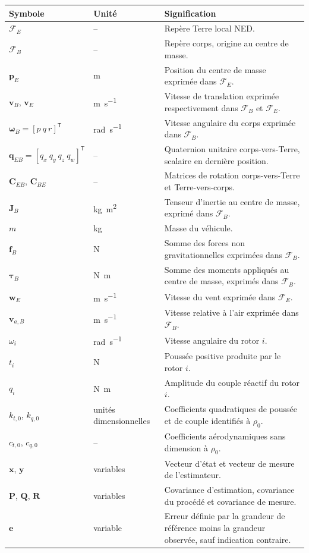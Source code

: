 \documentclass[11pt,a4paper,oneside]{report}
\newcommand{\vect}[1]{\bm{#1}}
\newcommand{\mat}[1]{\bm{#1}}
\newcommand{\trans}{^{\mathsf T}}
\begin{document}
	\begin{longtable}{@{}L{3.2cm}L{2.5cm}L{10.0cm}@{}}
		\toprule
		\textbf{Symbole} & \textbf{Unité} & \textbf{Signification}\\
		\midrule
		$\mathcal F_E$ & -- & Repère Terre local NED.\\
		$\mathcal F_B$ & -- & Repère corps, origine au centre de masse.\\
		$\vect p_E$ & \si{m} & Position du centre de masse exprimée dans $\mathcal F_E$.\\
		$\vect v_B$, $\vect v_E$ & \si{m.s^{-1}} & Vitesse de translation exprimée respectivement dans $\mathcal F_B$ et $\mathcal F_E$.\\
		$\vect\omega_B=[p\ q\ r]\trans$ & \si{rad.s^{-1}} & Vitesse angulaire du corps exprimée dans $\mathcal F_B$.\\
		$\vect q_{EB}=[q_x\ q_y\ q_z\ q_w]\trans$ & -- & Quaternion unitaire corps-vers-Terre, scalaire en dernière position.\\
		$\mat C_{EB}$, $\mat C_{BE}$ & -- & Matrices de rotation corps-vers-Terre et Terre-vers-corps.\\
		$\mat J_B$ & \si{kg.m^2} & Tenseur d'inertie au centre de masse, exprimé dans $\mathcal F_B$.\\
		$m$ & \si{kg} & Masse du véhicule.\\
		$\vect f_B$ & \si{N} & Somme des forces non gravitationnelles exprimées dans $\mathcal F_B$.\\
		$\vect\tau_B$ & \si{N.m} & Somme des moments appliqués au centre de masse, exprimés dans $\mathcal F_B$.\\
		$\vect w_E$ & \si{m.s^{-1}} & Vitesse du vent exprimée dans $\mathcal F_E$.\\
		$\vect v_{a,B}$ & \si{m.s^{-1}} & Vitesse relative à l'air exprimée dans $\mathcal F_B$.\\
		$\omega_i$ & \si{rad.s^{-1}} & Vitesse angulaire du rotor $i$.\\
		$t_i$ & \si{N} & Poussée positive produite par le rotor $i$.\\
		$q_i$ & \si{N.m} & Amplitude du couple réactif du rotor $i$.\\
		$k_{t,0}$, $k_{q,0}$ & unités dimensionnelles & Coefficients quadratiques de poussée et de couple identifiés à $\rho_0$.\\
		$c_{t,0}$, $c_{q,0}$ & -- & Coefficients aérodynamiques sans dimension à $\rho_0$.\\
		$\vect x$, $\vect y$ & variables & Vecteur d'état et vecteur de mesure de l'estimateur.\\
		$\mat P$, $\mat Q$, $\mat R$ & variables & Covariance d'estimation, covariance du procédé et covariance de mesure.\\
		$\vect e$ & variable & Erreur définie par la grandeur de référence moins la grandeur observée, sauf indication contraire.\\
		\bottomrule
	\end{longtable}
	
\end{document}
